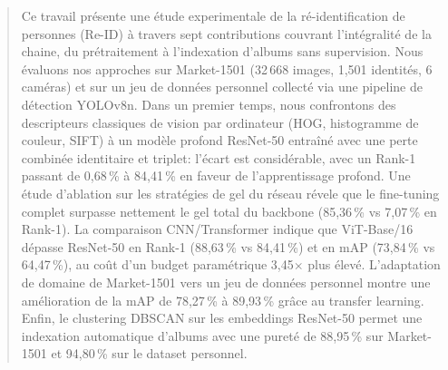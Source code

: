 \begin{abstract}
Ce travail présente une étude experimentale de la ré-identification de personnes (Re-ID) à travers sept contributions couvrant l'intégralité de la chaine, du prétraitement à l'indexation d'albums sans supervision. Nous évaluons nos approches sur Market-1501 (32\,668 images, 1,501 identités, 6 caméras) et sur un jeu de données personnel collecté via une pipeline de détection YOLOv8n. Dans un premier temps, nous confrontons des descripteurs classiques de vision par ordinateur (HOG, histogramme de couleur, SIFT) à un modèle profond ResNet-50 entraîné avec une perte combinée identitaire et triplet: l'écart est considérable, avec un Rank-1 passant de 0,68\,\% \`{a} 84,41\,\% en faveur de l'apprentissage profond. Une étude d'ablation sur les stratégies de gel du réseau révele que le fine-tuning complet surpasse nettement le gel total du backbone (85,36\,\% vs 7,07\,\% en Rank-1). La comparaison CNN/Transformer indique que ViT-Base/16 dépasse ResNet-50 en Rank-1 (88,63\,\% vs 84,41\,\%) et en mAP (73,84\,\% vs 64,47\,\%), au coût d'un budget paramétrique 3,45$\times$ plus élevé. L'adaptation de domaine de Market-1501 vers un jeu de données personnel montre une amélioration de la mAP de 78,27\,\% \`{a} 89,93\,\% grâce au transfer learning. Enfin, le clustering DBSCAN sur les embeddings ResNet-50 permet une indexation automatique d'albums avec une pureté de 88,95\,\% sur Market-1501 et 94,80\,\% sur le dataset personnel.
\end{abstract}